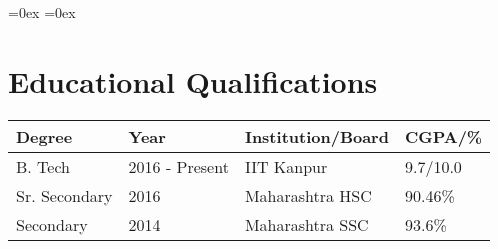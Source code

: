 \setlength\extrarowheight{3pt}  %
\aboverulesep=0ex  %
\belowrulesep=0ex  %

\section*{Educational Qualifications}
\begin{tabularx}{\textwidth}{|L|L|L|L|}

\toprule
\textbf{Degree} & \textbf{Year}  & \textbf{Institution/Board} & \textbf{CGPA/\%}\\
\midrule
B. Tech         & 2016 - Present & IIT Kanpur                 & 9.7/10.0\\
Sr. Secondary   & 2016           & Maharashtra HSC            & 90.46\%\\
Secondary       & 2014           & Maharashtra SSC            & 93.6\%\\
\bottomrule

\end{tabularx}
